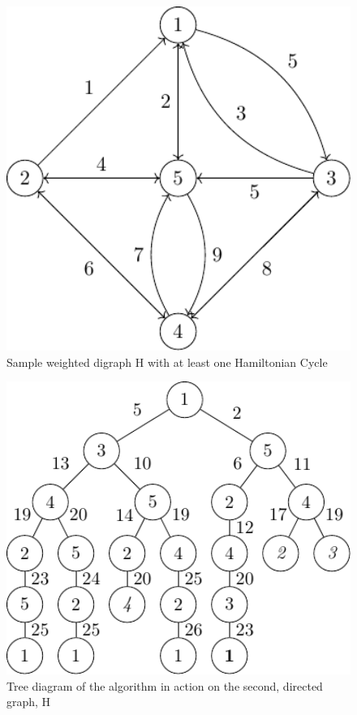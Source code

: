 \begin{figure}
\centering
\includegraphics[keepaspectratio,width=1.0\textwidth,height=0.35\textheight]{chapters/tsp/figs/ugraph-figure2}
\caption{\label{fig:tsp:digraph}Sample weighted digraph H with at least one Hamiltonian Cycle}
\end{figure}

\begin{figure}
\centering
\includegraphics[keepaspectratio,width=1.0\textwidth,height=0.35\textheight]{chapters/tsp/figs/ugraph-figure3}
\caption[Tree diagram of the algorithm's operation on a directed graph]{\label{fig:tsp:dtree}Tree diagram of the algorithm in action on the second, directed graph, H}
\end{figure}

